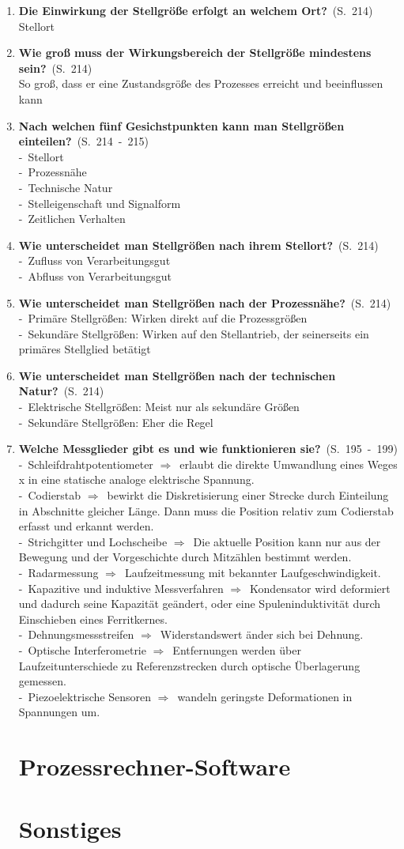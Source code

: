 \documentclass[a4paper,12pt]{article}
\newcommand{\question}[3]{\pagebreak[3]\item {\textbf{#1?}}\ (S.\ #2)#3}
\newcommand{\catchword}[1]{\\-\ #1}
\newcommand{\normaltext}[1]{\\#1}
\newcommand{\resultol}[1]{ $\Rightarrow$\ #1}
\newcommand{\page}[1]{#1}
\newcommand{\pages}[2]{#1\ -\ #2}
\begin{document}
\begin{enumerate}
  \question{Die Einwirkung der Stellgröße erfolgt an welchem Ort}{\page{214}}
  {
    \normaltext{Stellort}
  }

  \question{Wie groß muss der Wirkungsbereich der Stellgröße mindestens sein}{\page{214}}
  {
    \normaltext{So groß, dass er eine Zustandsgröße des Prozesses erreicht und
                beeinflussen kann}
  }

  \question{Nach welchen fünf Gesichstpunkten kann man Stellgrößen einteilen}{\pages{214}{215}}
  {
    \catchword{Stellort}
    \catchword{Prozessnähe}
    \catchword{Technische Natur}
    \catchword{Stelleigenschaft und Signalform}
    \catchword{Zeitlichen Verhalten}
  }

  \question{Wie unterscheidet man Stellgrößen nach ihrem Stellort}{\page{214}}
  {
    \catchword{Zufluss von Verarbeitungsgut}
    \catchword{Abfluss von Verarbeitungsgut}
  }

  \question{Wie unterscheidet man Stellgrößen nach der Prozessnähe}{\page{214}}
  {
    \catchword{Primäre Stellgrößen: Wirken direkt auf die Prozessgrößen}
    \catchword{Sekundäre Stellgrößen: Wirken auf den Stellantrieb, der seinerseits
              ein primäres Stellglied betätigt}
  }

  \question{Wie unterscheidet man Stellgrößen nach der technischen Natur}{\page{214}}
  {
    \catchword{Elektrische Stellgrößen: Meist nur als sekundäre Größen}
    \catchword{Sekundäre Stellgrößen: Eher die Regel}
  }

     \question{Welche Messglieder gibt es und wie funktionieren sie}{\pages{195}{199}}
  {
    \catchword{Schleifdrahtpotentiometer \resultol{erlaubt die direkte Umwandlung eines Weges x in
    eine statische analoge elektrische Spannung.}}
    \catchword{Codierstab \resultol{bewirkt die Diskretisierung einer Strecke durch Einteilung in Abschnitte 
    gleicher Länge. Dann muss die Position relativ zum Codierstab erfasst und erkannt werden.}}
    \catchword{Strichgitter und Lochscheibe \resultol{Die aktuelle Position kann nur aus der Bewegung und der 
    Vorgeschichte durch Mitzählen bestimmt werden.}}
    \catchword{Radarmessung \resultol{Laufzeitmessung mit bekannter Laufgeschwindigkeit.}}
    \catchword{Kapazitive und induktive Messverfahren \resultol{Kondensator wird deformiert und dadurch seine
    Kapazität geändert, oder eine Spuleninduktivität durch Einschieben eines Ferritkernes.}}
    \catchword{Dehnungsmessstreifen \resultol{Widerstandswert änder sich bei Dehnung.}}
    \catchword{Optische Interferometrie \resultol{Entfernungen werden über Laufzeitunterschiede zu Referenzstrecken
    durch optische Überlagerung gemessen.}}
    \catchword{Piezoelektrische Sensoren \resultol{wandeln geringste Deformationen in Spannungen um.}}
  }


  \newpage
  \section{Prozessrechner-Software}


  \newpage
  \section{Sonstiges}


\end{enumerate}
\end{document}
